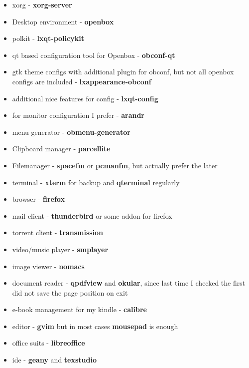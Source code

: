 \documentclass[10pt,a4paper]{article}
\begin{document}
                    \begin{itemize}
                        \item xorg - \textbf{xorg-server}
                        \item Desktop environment - \textbf{openbox}
                        \item polkit - \textbf{lxqt-policykit}
                        \item qt based configuration tool for Openbox - \textbf{obconf-qt}
                        \item gtk theme configs with additional plugin for obconf, but not all openbox configs are included - \textbf{lxappearance-obconf}
                        \item additional nice features for config - \textbf{lxqt-config}
                        \item for monitor configuration I prefer - \textbf{arandr}
                        \item menu generator - \textbf{obmenu-generator}
                        \item Clipboard manager - \textbf{parcellite}
                        \item Filemanager - \textbf{spacefm} or \textbf{pcmanfm}, but actually prefer the later
                        \item terminal - \textbf{xterm} for backup and \textbf{qterminal} regularly
                        \item browser - \textbf{firefox}
                        \item mail client - \textbf{thunderbird} or some addon for firefox
                        \item torrent client - \textbf{transmission}
                        \item video/music player - \textbf{smplayer}
                        \item image viewer - \textbf{nomacs}
                        \item document reader - \textbf{qpdfview} and \textbf{okular}, since last time I checked the first did not save the page position on exit
                        \item e-book management for my kindle - \textbf{calibre}
                        \item editor - \textbf{gvim} but in most cases \textbf{mousepad} is enough
                        \item office suits - \textbf{libreoffice}
                        \item ide - \textbf{geany} and \textbf{texstudio}

\end{itemize}
\end{document}
